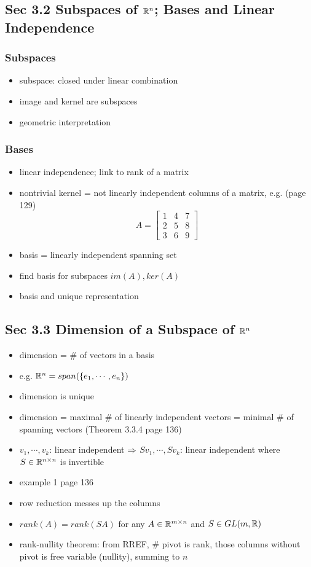 \documentclass[12pt,a4paper]{article}
\newcommand{\ra}[1]{\ifnum #1=1\rightarrow\fi\ifnum #1=2\Rightarrow\fi\ifnum #1=3\Rrightarrow\fi\ifnum #1=4\rightrightarrows\fi\ifnum #1=5\rightleftarrows\fi\ifnum #1=6\mapsto\fi\ifnum #1=7\iffalse\fi\fi\ifnum #1=8\twoheadrightarrow\fi\ifnum #1=9\rightharpoonup\fi\ifnum #1=0\rightharpoondown\fi}
\renewcommand{\l}{\left}
\renewcommand{\r}{\right}
\newcommand{\x}{\times}
\def\R{\ifmmode\mathbb R\fi}
\begin{document}
\subsection*{Sec 3.2 Subspaces of $\R^n$; Bases and Linear Independence}
\subsubsection*{Subspaces}
\begin{itemize}
    \item subspace: closed under linear combination
    \item image and kernel are subspaces
    \item geometric interpretation
\end{itemize}
\subsubsection*{Bases}
\begin{itemize}
    \item linear independence; link to rank of a matrix
    \item nontrivial kernel = not linearly independent columns of a matrix, e.g. (page 129)
	$$A = \l[
	\begin{array}{ccc}
	    1&4&7\\
	    2&5&8\\
	    3&6&9
	\end{array}
	\r]$$
    \item basis = linearly independent spanning set
    \item find basis for subspaces $im(A), ker(A)$
    \item basis and unique representation
\end{itemize}

\subsection*{Sec 3.3 Dimension of a Subspace of $\R^n$}
\begin{itemize}
    \item dimension = \# of vectors in a basis
    \item e.g. $\R^n = span(\{e_1, \cdots, e_n\})$
    \item dimension is unique 
    \item dimension = maximal \# of linearly independent vectors = minimal \# of spanning vectors (Theorem 3.3.4 page 136)
    \item $v_1, \cdots, v_k$: linear independent $\ra2$ $Sv_1, \cdots, Sv_k$: linear independent where $S \in \R^{n\x n}$ is invertible
    \item example 1 page 136
    \item row reduction messes up the columns
    \item $rank(A) = rank(SA)$ for any $A\in \R^{m\x n}$ and $S \in GL(m, \R)$
    \item rank-nullity theorem: from RREF, \# pivot is rank, those columns without pivot is free variable (nullity), summing to $n$
\end{itemize}
\end{document}
